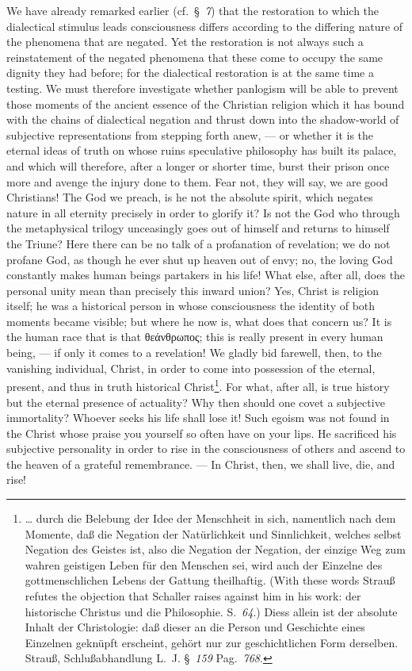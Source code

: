 \documentclass[12pt]{book}
\newcommand{\opage}[1]{\marginnote{\footnotesize\textit{[#1]}}}
\begin{document}
We have already remarked earlier (cf.\ §~\textit{7}) that the restoration to
which the dialectical stimulus leads consciousness differs according to the
differing nature of the phenomena that are negated. Yet the restoration is not
always such a reinstatement of the negated phenomena that these come to occupy
the same dignity they had before; for the dialectical restoration is at the
same time a testing. We must therefore investigate whether panlogism will be
able to prevent those moments of the ancient essence of the Christian religion
which it has bound with the chains of dialectical negation and thrust down into
the shadow-world of subjective representations from stepping forth anew, --- or
whether it is the eternal ideas of truth on whose ruins speculative philosophy
has built its
\opage{137} \setcounter{footnote}{0}%
palace, and which will therefore, after a longer or shorter time, burst their
prison once more and avenge the injury done to them. Fear not, they will say, we
are good Christians! The God we preach, is he not the absolute spirit, which
negates nature in all eternity precisely in order to glorify it? Is not the God
who through the metaphysical trilogy unceasingly goes out of himself and
returns to himself the Triune? Here there can be no talk of a profanation of
revelation; we do not profane God, as though he ever shut up heaven out of
envy; no, the loving God constantly makes human beings partakers in his life!
What else, after all, does the personal unity mean than precisely this inward
union? Yes, Christ is religion itself; he was a historical person in whose
consciousness the identity of both moments became visible; but where he now is,
what does that concern us? It is the human race that is that θεάνθρωπος; this
is really present in every human being, --- if only it comes to a revelation!
We gladly bid farewell, then, to the vanishing individual, Christ, in order to
come into possession of the eternal, present, and thus in truth historical
Christ\footnote{\ldots{}
durch die Belebung der Idee der Menschheit in sich, namentlich nach dem Momente,
daß die Negation der Natürlichkeit und Sinnlichkeit, welches selbst Negation des
Geistes ist, also die Negation der Negation, der einzige Weg zum wahren
geistigen Leben für den Menschen sei, wird auch der Einzelne des
gottmenschlichen Lebens der Gattung theilhaftig. (With these words Strauß
refutes the objection that Schaller raises against him in his work: der
historische Christus und die Philosophie. S.~\textit{64}.) Diess allein ist der
absolute Inhalt der Christologie: daß dieser an die Person und Geschichte eines
Einzelnen geknüpft erscheint, gehört nur zur geschichtlichen Form derselben.
Strauß, Schlußabhandlung L.~J. §~\textit{159} Pag.~\textit{768}.}. For what,
after all, is true
\opage{138} history but the eternal presence of actuality? Why then should one
covet a subjective immortality? Whoever seeks his life shall lose it! Such
egoism was not found in the Christ whose praise you yourself so often have on
your lips. He sacrificed his subjective personality in order to rise in the
consciousness of others and ascend to the heaven of a grateful remembrance. ---
In Christ, then, we shall live, die, and rise!
\end{document}
